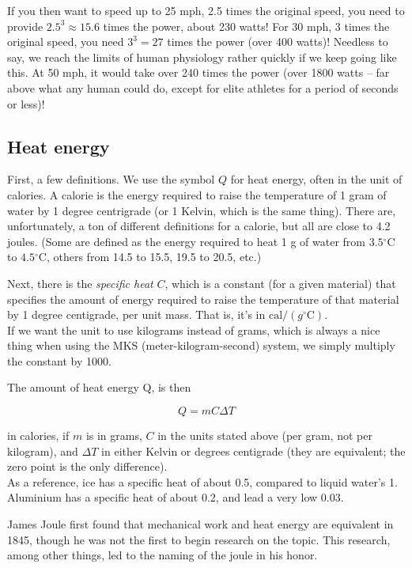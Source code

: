 \documentclass[12pt,a4paper]{report}
\begin{document}
If you then want to speed up to 25 mph, 2.5 times the original speed, you need to provide $2.5^{3} \approx 15.6$ times the power, about 230 watts! For 30 mph, 3 times the original speed, you need $3^3 = 27$ times the power (over 400 watts)! Needless to say, we reach the limits of human physiology rather quickly if we keep going like this. At 50 mph, it would take over 240 times the power (over 1800 watts -- far above what any human could do, except for elite athletes for a period of seconds or less)!

\subsection{Heat energy}

First, a few definitions. We use the symbol $Q$ for heat energy, often in the unit of calories. A calorie is the energy required to raise the temperature of 1 gram of water by 1 degree centrigrade (or 1 Kelvin, which is the same thing). There are, unfortunately, a ton of different definitions for a calorie, but all are close to 4.2 joules. (Some are defined as the energy required to heat 1 g of water from $3.5 {}^\circ$C to $4.5 {}^\circ$C, others from 14.5 to 15.5, 19.5 to 20.5, etc.)

Next, there is the \emph{specific heat} $C$, which is a constant (for a given material) that specifies the amount of energy required to raise the temperature of that material by 1 degree centigrade, per unit mass. That is, it's in $\text{cal}/(g {}^\circ\text{C})$.\\
If we want the unit to use kilograms instead of grams, which is always a nice thing when using the MKS (meter-kilogram-second) system, we simply multiply the constant by 1000.

The amount of heat energy Q, is then

\begin{equation}
Q = m C \Delta T
\end{equation}

in calories, if $m$ is in grams, $C$ in the units stated above (per gram, not per kilogram), and $\Delta T$ in either Kelvin or degrees centigrade (they are equivalent; the zero point is the only difference).\\
As a reference, ice has a specific heat of about 0.5, compared to liquid water's 1. Aluminium has a specific heat of about 0.2, and lead a very low 0.03.

James Joule first found that mechanical work and heat energy are equivalent in 1845, though he was not the first to begin research on the topic. This research, among other things, led to the naming of the joule in his honor.
\end{document}
